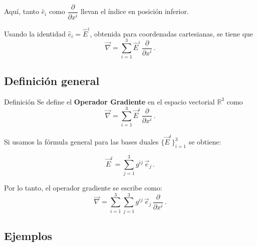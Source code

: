 \documentclass[../apunte_mecanica_clasica.tex]{subfiles}%
\begin{document}
Aquí, tanto $\hat{e}_i$ como $\dfrac{\partial}{\partial x^i}$ llevan 
el índice en posición inferior.

Usando la identidad $\hat{e}_i = \hat{E}^i$, obtenida para coordenadas
cartesianas, se tiene que
\begin{equation*}
    \vec{\nabla} = \sum_{i=1}^3 \hat{E}^i \,\frac{\partial}{\partial x^i} \,.
\end{equation*}


\newpage

\subsection{Definición general}

\begin{apuntebloque}{Definición}
Se define el \textbf{Operador Gradiente} en el espacio vectorial 
$\mathbb{R}^3$ como
\begin{equation*}
    \vec{\nabla} = \sum_{i=1}^3 \vec{E}^i \, \frac{\partial}{\partial x^i} \,.
\end{equation*}
\end{apuntebloque}

Si usamos la fórmula general para las bases duales $\{\vec{E}^i\}_{i=1}^3$ se obtiene:

\begin{equation*}
    \vec{E}^i = \sum_{j=1}^3 g^{ij} \, \vec{e}_j \,.
\end{equation*}

Por lo tanto, el operador gradiente se escribe como:
\begin{equation*}
    \vec{\nabla} = \sum_{i=1}^3 \sum_{j=1}^3 g^{ij} \, \vec{e}_j \, \frac{\partial}{\partial x^i} \,.
\end{equation*}


\subsection{Ejemplos}
\end{document}
